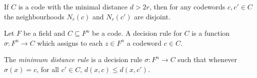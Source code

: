 \documentclass{article}
\begin{document}
\begin{lemma}[Lecture 10]
	If $C$ is a code with the minimal distance $d>2r$, then for any codewords $c,c'\in C$ the neighbourhoods
	$N_r(c)$ and $N_r(c')$ are disjoint.
\end{lemma}

\begin{definition}[Lecture 10]
	Let $F$ be a field and $C\subseteq F^n$ be a code. A decision rule for $C$ is a function
	$\sigma:F^n\to C$ which assigns to each $z\in F^n$ a codeword $c\in C$.
\end{definition}

\begin{definition}
	The \emph{minimum distance rule} is a decision rule $\sigma:F^n\to C$ such that
	whenever $\sigma(x)=c$, for all $c'\in C$, $d(x,c) \leq d(x,c')$.
\end{definition}
\end{document}
